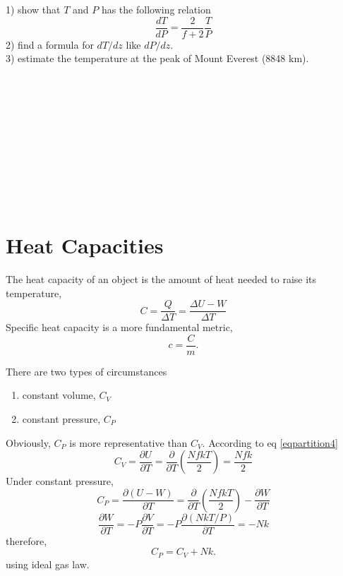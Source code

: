 1) show that $T$ and $P$ has the following relation
  \begin{equation} \frac{dT}{dP} = \frac{2}{f+2} \frac{T}{P} \end{equation}
2) find a formula for $dT/dz$ like $dP/dz$.\\
3) estimate the temperature at the peak of Mount Everest (8848 km).\\\\\\\\\\\\\\\\\\\\\

\section{Heat Capacities}
The heat capacity of an object is the amount of heat needed to raise its temperature,
  \begin{equation} C = \frac{Q}{\Delta{T}} = \frac{\Delta{U}-W}{\Delta{T}}\end{equation}
Specific heat capacity is a more fundamental metric,
  \begin{equation} c = \frac{C}{m}. \end{equation}

There are two types of circumstances
\begin{enumerate}
\item{constant volume}, $C_V$
\item{constant pressure}, $C_P$
\end{enumerate}
Obviously, $C_P$ is more representative than $C_V$.
According to eq \ref{eqpartition4}
  \begin{equation} C_V = \frac{\partial U}{\partial{T}} 
                       = \frac{\partial} {\partial{T}}(\frac {NfkT}{2})
                       = \frac{Nfk}{2}
  \end{equation}
Under constant pressure,
  \begin{equation} C_P = \frac{\partial (U-W)} {\partial{T}} 
                       = \frac{\partial} {\partial{T}}(\frac {NfkT}{2}) - \frac{\partial W}{\partial{T}}
  \end{equation}
  \begin{equation}
                \frac{\partial W}{\partial{T}} = -P\frac{\partial V}{\partial T} 
                                                = -P\frac{\partial (NkT/P)}{\partial T} 
                                                = -Nk
  \end{equation}
therefore, 
  \begin{equation} C_P = C_V + Nk. \end{equation}
using ideal gas law.\\\\

